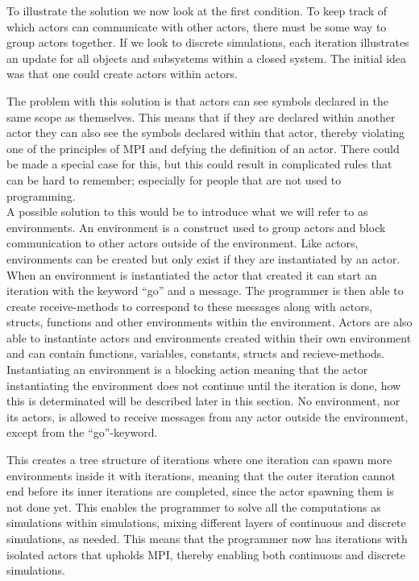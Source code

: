To illustrate the solution we now look at the first condition.
To keep track of which actors can communicate with other actors, there must be some way to group actors together. If we look to discrete simulations, each iteration illustrates an update for all objects and subsystems within a closed system. The initial idea was that one could create actors within actors. 

The problem with this solution is that actors can see symbols declared in the same scope as themselves. This means that if they are declared within another actor they can also see the symbols declared within that actor, thereby violating one of the principles of MPI and defying the definition of an actor. There could be made a special case for this, but this could result in complicated rules that can be hard to remember; especially for people that are not used to programming.\\

A possible solution to this would be to introduce what we will refer to as environments. An environment is a construct used to group actors and block communication to other actors outside of the environment. Like actors, environments can be created but only exist if they are instantiated by an actor. When an environment is instantiated the actor that created it can start an iteration with the keyword \enquote{go} and a message. The programmer is then able to create receive-methods to correspond to these messages along with actors, structs, functions and other environments within the environment. Actors are also able to instantiate actors and environments created within their own environment and can contain functions, variables, constants, structs and recieve-methods.\\

Instantiating an environment is a blocking action meaning that the actor instantiating the environment does not continue until the iteration is done, how this is determinated will be described later in this section. No environment, nor its actors, is allowed to receive messages from any actor outside the environment, except from the \enquote{go}-keyword. 

This creates a tree structure of iterations where one iteration can spawn more environments inside it with iterations, meaning that the outer iteration cannot end before its inner iterations are completed, since the actor spawning them is not done yet. This enables the programmer to solve all the computations as simulations within simulations, mixing different layers of continuous and discrete simulations, as needed. This means that the programmer now has iterations with isolated actors that upholds MPI, thereby enabling both continuous and discrete simulations.\\

